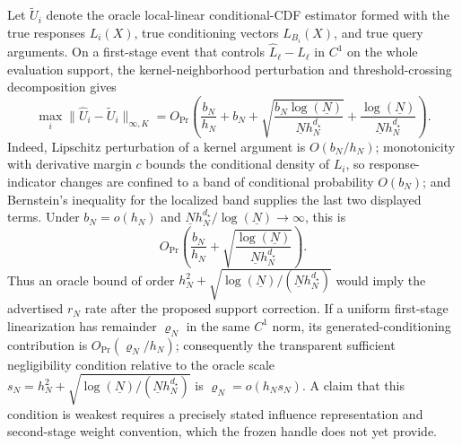 Let \(\widetilde U_i\) denote the oracle local-linear conditional-CDF estimator formed with the true responses \(L_i(X)\), true conditioning vectors \(L_{B_i}(X)\), and true query arguments.  On a first-stage event that controls \(\widehat L_\ell-L_\ell\) in \(C^1\) on the whole evaluation support, the kernel-neighborhood perturbation and threshold-crossing decomposition gives
\[
 \max_i\|\widehat U_i-\widetilde U_i\|_{\infty,K}
 =O_{\Pr}\!\left(
 \frac{b_N}{h_N}+b_N+\sqrt{\frac{b_N\log(\underline N)}{\underline N h_N^{d_\star}}}
 +\frac{\log(\underline N)}{\underline N h_N^{d_\star}}
 \right).
\]
Indeed, Lipschitz perturbation of a kernel argument is \(O(b_N/h_N)\); monotonicity with derivative margin \(c\) bounds the conditional density of \(L_i\), so response-indicator changes are confined to a band of conditional probability \(O(b_N)\); and Bernstein's inequality for the localized band supplies the last two displayed terms.  Under \(b_N=o(h_N)\) and \(\underline N h_N^{d_\star}/\log(\underline N)\to\infty\), this is
\[
 O_{\Pr}\!\left(\frac{b_N}{h_N}
 +\sqrt{\frac{\log(\underline N)}{\underline N h_N^{d_\star}}}\right).
\]
Thus an oracle bound of order \(h_N^2+\sqrt{\log(\underline N)/(\underline N h_N^{d_\star})}\) would imply the advertised \(r_N\) rate after the proposed support correction.  If a uniform first-stage linearization has remainder \(\varrho_N\) in the same \(C^1\) norm, its generated-conditioning contribution is \(O_{\Pr}(\varrho_N/h_N)\); consequently the transparent sufficient negligibility condition relative to the oracle scale \(s_N=h_N^2+\sqrt{\log(\underline N)/(\underline N h_N^{d_\star})}\) is \(\varrho_N=o(h_Ns_N)\).  A claim that this condition is weakest requires a precisely stated influence representation and second-stage weight convention, which the frozen handle does not yet provide.
